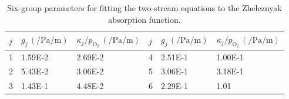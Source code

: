 \documentclass{iopjournal}
\providecommand\Otwo{\ensuremath{\textrm{O}_2}}
\begin{document}
\begin{table}[h!t!b!]
  \centering
  \caption{
    Six-group parameters for fitting the two-stream equations to the Zheleznyak absorption function.
  }
  \label{tab:photoionization_parameters}
  \small
  \begin{tabular}{@{}lll|lll}
    \hline
    $j$ & $g_j\,\left(\si{\per\pascal\per\meter}\right)$ & $\kappa_j/p_{\Otwo}\,\left(\si{\per\pascal\per\meter}\right)$ &     $j$ & $g_j\,\left(\si{\per\pascal\per\meter}\right)$ & $\kappa_j/p_{\Otwo}\,\left(\si{\per\pascal\per\meter}\right)$ \\
    \hline
    1 & \num{1.59E-2} & \num{2.69E-2} & 4 & \num{2.51E-1} & \num{1.00E-1} \\
    2 & \num{5.43E-2} & \num{3.06E-2} & 5 & \num{3.06E-1} & \num{3.18E-1} \\
    3 & \num{1.43E-1} & \num{4.48E-2} & 6 & \num{2.29E-1} & \num{1.01} \\
  \end{tabular}
\end{table}





\printbibliography
\end{document}
